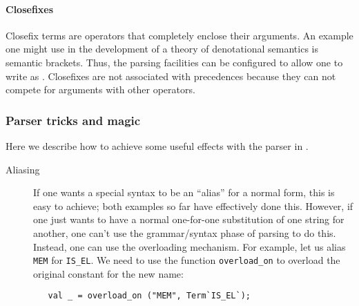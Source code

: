 {\paragraph{Closefixes}

Closefix terms are operators that completely enclose their arguments.
An example one might use in the development of a theory of
denotational semantics is semantic brackets.  Thus, the \HOL{} parsing
facilities can be configured to allow one to write 
as \holtxt{[| x |]}.  Closefixes are not associated with precedences
because they can not compete for arguments with other operators.


\subsubsection{Parser tricks and magic}

Here we describe how to achieve some useful effects with the
parser in \HOL{}.

\begin{description}

\item[Aliasing] If one wants a special syntax to be an ``alias'' for a
  normal \HOL{} form, this is easy to achieve; both examples so far
  have effectively done this.  However, if one just wants to have a
  normal one-for-one substitution of one string for another, one can't
  use the grammar/syntax phase of parsing to do this.  Instead, one
  can use the overloading mechanism.  For example, let us alias
  \texttt{MEM} for \texttt{IS\_EL}.  We need to use the function
  \texttt{overload\_on} to overload the original constant for the new
  name:
\begin{hol}
\begin{verbatim}
   val _ = overload_on ("MEM", Term`IS_EL`);
\end{verbatim}
\end{hol}


\end{description}}

